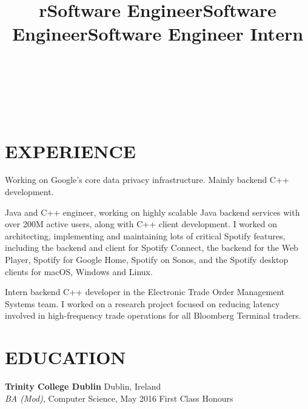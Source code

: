 \documentclass[overlapped,12pt]{res}
\begin{document}
\begin{resume}

\begin{format}
\title{r}\\
\\
\body\\
\end{format}

\section{EXPERIENCE}
\title{Software Engineer}
\begin{position}
Working on Google's core data privacy infrastructure. Mainly backend C++ development.
\end{position}

\title{Software Engineer}
\begin{position}
Java and C++ engineer, working on highly scalable Java backend services with
over 200M active users, along with C++ client development. I worked on
architecting, implementing and maintaining lots of critical Spotify features,
including the backend and client for Spotify Connect, the backend for the Web
Player, Spotify for Google Home, Spotify on Sonos, and the Spotify desktop
clients for macOS, Windows and Linux.
\end{position}

\title{Software Engineer Intern}
\begin{position}
Intern backend C++ developer in the Electronic Trade Order Management Systems
team. I worked on a research project focused on reducing latency involved in
high-frequency trade operations for all Bloomberg Terminal traders.
\end{position}

\section{EDUCATION}
\textbf{Trinity College Dublin}\hfill
Dublin, Ireland\\
{\sl BA (Mod)}, Computer Science, May 2016\hfill 
First Class Honours


\end{resume}
\end{document}
